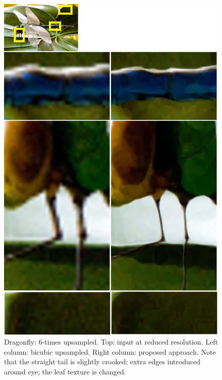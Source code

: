 \begin{figure}[htbp]\centering
\includegraphics{imagesPM/f11.png}
\caption{Dragonfly: 6-times upsampled. Top: input at reduced resolution. Left column: bicubic upsampled. Right column: proposed approach. Note that the straight tail is slightly crooked; extra edges introduced around eye; the leaf texture is changed.}
\label{fig:compOursBicubic}
\end{figure}

